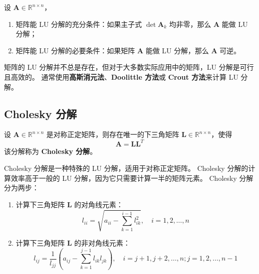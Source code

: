 \begin{proposition}[LU 分解的存在性]
    设 $\mathbf{A} \in \mathbb{R}^{n \times n}$，
    \begin{enumerate}
        \item 矩阵能 LU 分解的充分条件：如果主子式 $\det{\mathbf{A}_k}$ 均非零，那么 $\mathbf{A}$ 能做 LU 分解；
        \item 矩阵能 LU 分解的必要条件：如果矩阵 $\mathbf{A}$ 能做 LU 分解，那么 $\mathbf{A}$ 可逆。
    \end{enumerate}
\end{proposition}

\begin{note}
    矩阵的 LU 分解并不总是存在，但对于大多数实际应用中的矩阵，LU 分解是可行且高效的。
    通常使用\textbf{高斯消元法}、\textbf{Doolittle 方法}或 \textbf{Crout 方法}来计算 LU 分解。
\end{note}
\vspace{1em}

\subsection{Cholesky 分解}

\begin{proposition}[Cholesky 分解]
    设 $\mathbf{A} \in \mathbb{R}^{n \times n}$ 是对称正定矩阵，则存在唯一的下三角矩阵 $\mathbf{L} \in \mathbb{R}^{n \times n}$，使得
    \[
        \mathbf{A} = \mathbf{L} \mathbf{L}^T
    \]
    该分解称为 \textbf{Cholesky 分解}。
    \label{proposition:cholesky_decomposition}
\end{proposition}

\begin{note}
    Cholesky 分解是一种特殊的 LU 分解，适用于对称正定矩阵。
    Cholesky 分解的计算效率高于一般的 LU 分解，因为它只需要计算一半的矩阵元素。
    Cholesky 分解分为两步：
    \begin{enumerate}
        \item 计算下三角矩阵 $\mathbf{L}$ 的对角线元素：
        \[
            l_{ii} = \sqrt{a_{ii} - \sum_{k=1}^{i-1} l_{ik}^2}, \quad i=1,2,\ldots,n
        \]
        \item 计算下三角矩阵 $\mathbf{L}$ 的非对角线元素：
        \[
            l_{ij} = \frac{1}{l_{jj}}\left(a_{ij} - \sum_{k=1}^{j-1} l_{ik} l_{jk}\right), \quad i=j+1,j+2,\ldots,n; j=1,2,\ldots,n-1
        \]
    \end{enumerate}
    \label{note:cholesky_decomposition}
\end{note}
\vspace{1em}


